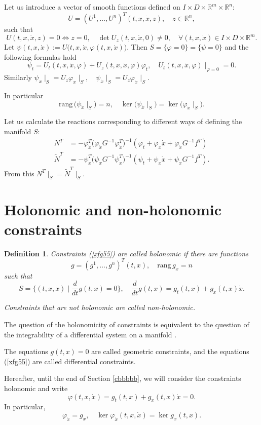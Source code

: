\documentclass[reqno,12pt]{amsproc}
\newtheorem{df}{Definition}
\newcommand\ph\varphi
\begin{document}
Let us introduce a vector of smooth functions defined on $I\times D\times\mathbb{R}^m\times\mathbb{R}^n:$
$$U=(U^1,\ldots,U^n)^T(t,x,\dot x,z),\quad z\in\mathbb{R}^n,$$
such that
$$U(t,x,\dot x,z)=0\Leftrightarrow z=0,\quad \det U_z(t,x,\dot x,0)\ne 0,\quad \forall (t,x,\dot x)\in I\times D\times\mathbb{R}^m.$$
Let $\psi(t,x,\dot x):=U\big(t,x,\dot x,\ph(t,x,\dot x)\big).$ Then $S=\{\ph=0\}=\{\psi=0\}$
and the following formulas hold
$$\psi_t=U_t(t,x,\dot x,\ph)+U_z(t,x,\dot x,\ph)\ph_t,\quad U_t(t,x,\dot x,\ph)\mid_{\ph=0}=0.$$
Similarly
$\psi_x\mid_S=U_z\ph_x\mid_S,\quad \psi_{\dot x}\mid_S=U_z\ph_{\dot x}\mid_S.$

In particular $$\mathrm{rang}\,\big(\psi_{\dot x}\mid_S\big)=n, \quad \ker \big(\psi_{\dot x}\mid_S\big)=\ker\big( \ph_{\dot x}\mid_S\big).$$

Let us calculate the reactions corresponding to different ways of defining the manifold $S$:
\begin{align}
N^T&=-\ph^T_{\dot x}\big(\ph_{\dot x}G^{-1}\ph_{\dot x}^T\big)^{-1}(\ph_t+\ph_x\dot x+\ph_{\dot x}G^{-1}f^T)\nonumber\\
\tilde N^T&=-\psi^T_{\dot x}\big(\psi_{\dot x}G^{-1}\psi_{\dot x}^T\big)^{-1}(\psi_t+\psi_x\dot x+\psi_{\dot x}G^{-1}f^T).\nonumber
\end{align}
From this
$
N^T\mid_S=\tilde N^T\mid_S.$
\section{Holonomic and non-holonomic constraints}
\begin{df}Constraints (\ref{xfg55}) are called holonomic if there are functions
$$g=(g^1,\ldots, g^n)^T(t,x),\quad \mathrm{rang}\, g_x=n$$ such that 
$$S=\Big\{(t,x,\dot x)\mid\frac{d}{dt}g(t,x) =0\Big\},\quad \frac{d}{dt}g(t,x)=g_t(t,x)+g_x(t,x)\dot x.$$

Constraints that are not holonomic are called non-holonomic.
\end{df}
The question of the holonomicity of constraints is equivalent to the question of the integrability of a differential system on a manifold \cite{stern}.

The equations $g(t,x)=0$ are called geometric constraints, and the equations (\ref{xfg55}) are called differential constraints.

Hereafter, until the end of Section \ref{cbbbbb}, we will consider the constraints holonomic and write
\begin{equation}\label{xdfg11gy}\ph(t,x,\dot x)=g_t(t,x)+g_x(t,x)\dot x=0.\end{equation}
In particular,
\begin{equation}\label{xf11q}\ph_{\dot x}=g_x,\quad\ker \ph_{\dot x}(t,x,\dot x)=\ker g_x(t,x).\end{equation}
\end{document}
